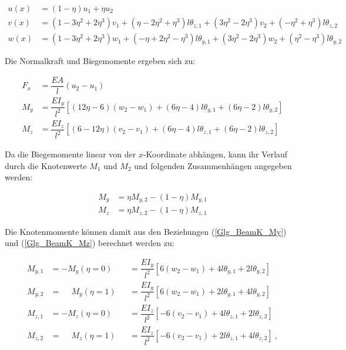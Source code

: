 \documentclass[11pt,titlepage,listof=totoc,bibliography=totoc,twoside]{scrreprt}
\begin{document}
\begin{align}
u(x)	&=	\left(1-\eta\right)u_1+\eta u_2	\\
v(x)	&=	\left(1-3\eta^2+2\eta^3\right)v_1+\left(\eta-2\eta^2+\eta^3\right)l\theta_{z,1}+\left(3\eta^2-2\eta^3\right)v_2+\left(-\eta^2+\eta^3\right)l\theta_{z,2}	\\
w(x)	&=	\left(1-3\eta^2+2\eta^3\right)w_1+\left(-\eta+2\eta^2-\eta^3\right)l\theta_{y,1}+\left(3\eta^2-2\eta^3\right)w_2+\left(\eta^2-\eta^3\right)l\theta_{y,2}
\end{align}

Die Normalkraft und Biegemomente ergeben sich zu:

\begin{align}
F_x	&=	\dfrac{EA}{l}\left(u_2-u_1\right)	\\
M_y	&=	\dfrac{EI_y}{l^2}\left[\left(12\eta-6\right)\left(w_2-w_1\right)+\left(6\eta-4\right)l\theta_{y,1}+\left(6\eta-2\right)l\theta_{y,2}\right]	\label{Glg_BeamK_My}	\\
M_z	&=	\dfrac{EI_z}{l^2}\left[\left(6-12\eta\right)\left(v_2-v_1\right)+\left(6\eta-4\right)l\theta_{z,1}+\left(6\eta-2\right)l\theta_{z,2}\right]	\label{Glg_BeamK_Mz}
\end{align}

Da die Biegemomente linear von der $x$-Koordinate abhängen, kann ihr Verlauf durch die Knotenwerte $M_1$ und $M_2$ und folgenden Zusammenhängen angegeben werden:

\begin{align}
M_y	&=	\eta M_{y,2}-\left(1-\eta\right)M_{y,1}	\\
M_z	&=	\eta M_{z,2}-\left(1-\eta\right)M_{z,1}
\end{align}

Die Knotenmomente können damit aus den Beziehungen (\ref{Glg_BeamK_My}) und (\ref{Glg_BeamK_Mz}) berechnet werden zu:

\begin{align}
M_{y,1}	&=	-M_y\left(\eta=0\right)				& &=	\dfrac{EI_y}{l^2}\left[6\left(w_2-w_1\right)+4l\theta_{y,1}+2l\theta_{y,2}\right]	\\
M_{y,2}	&=	\phantom{-}M_y\left(\eta=1\right)	& &=	\dfrac{EI_y}{l^2}\left[6\left(w_2-w_1\right)+2l\theta_{y,1}+4l\theta_{y,2}\right]	\\
M_{z,1}	&=	-M_z\left(\eta=0\right)				& &=	\dfrac{EI_z}{l^2}\left[-6\left(v_2-v_1\right)+4l\theta_{z,1}+2l\theta_{z,2}\right]	\\
M_{z,2}	&=	\phantom{-}M_z\left(\eta=1\right)	& &=	\dfrac{EI_z}{l^2}\left[-6\left(v_2-v_1\right)+2l\theta_{z,1}+4l\theta_{z,2}\right] \ ,
\end{align}
\end{document}
